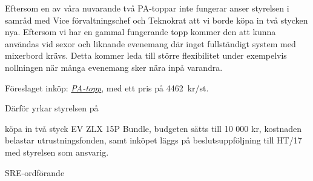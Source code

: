 \documentclass[../_main/handlingar.tex]{subfiles}
\begin{document}

Eftersom en av våra nuvarande två PA-toppar inte fungerar anser styrelsen i samråd med Vice förvaltningschef och Teknokrat att vi borde köpa in två stycken nya. Eftersom vi har en gammal fungerande topp kommer den att kunna användas vid sexor och liknande evenemang där inget fullständigt system med mixerbord krävs. Detta kommer leda till större flexibilitet under exempelvis nollningen när många evenemang sker nära inpå varandra.

Föreslaget inköp: \href{https://www.thomann.de/se/ev_zlx_15p_bundle_2.htm?ref=search_rslt_EV+ZLX+15P_340452_2}{\textit{PA-topp}}, med ett pris på \SI{4462}{kr/st}.

Därför yrkar styrelsen på

\begin{attsatser}
    \att köpa in två styck EV ZLX 15P Bundle,
    \att budgeten sätts till 10 000 kr,
    \att kostnaden belastar utrustningsfonden, samt
    \att inköpet läggs på beslutsuppföljning till HT/17 med styrelsen som ansvarig.
\end{attsatser}

\begin{signatures}{1}
    \ist
    \signature{\sreordf}{SRE-ordförande}
\end{signatures}
\end{document}
